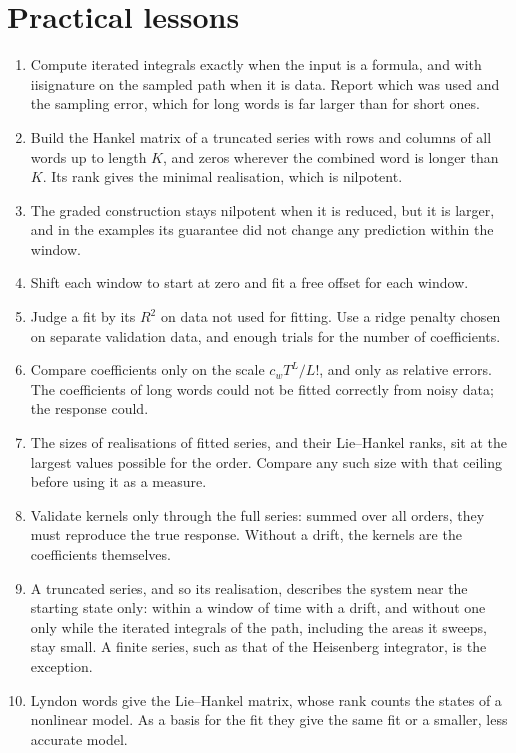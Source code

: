 \documentclass[11pt,a4paper]{article}
\theoremstyle{remark}
\begin{document}
\section{Practical lessons}\label{sec:lessons}
\begin{enumerate}
\item Compute iterated integrals exactly when the input is a formula, and with iisignature on the sampled path when it is data. Report which was used and the sampling error, which for long words is far larger than for short ones.
\item Build the Hankel matrix of a truncated series with rows and columns of all words up to length $K$, and zeros wherever the combined word is longer than $K$. Its rank gives the minimal realisation, which is nilpotent.
\item The graded construction stays nilpotent when it is reduced, but it is larger, and in the examples its guarantee did not change any prediction within the window.
\item Shift each window to start at zero and fit a free offset for each window.
\item Judge a fit by its $R^2$ on data not used for fitting. Use a ridge penalty chosen on separate validation data, and enough trials for the number of coefficients.
\item Compare coefficients only on the scale $c_wT^L/L!$, and only as relative errors. The coefficients of long words could not be fitted correctly from noisy data; the response could.
\item The sizes of realisations of fitted series, and their Lie--Hankel ranks, sit at the largest values possible for the order. Compare any such size with that ceiling before using it as a measure.
\item Validate kernels only through the full series: summed over all orders, they must reproduce the true response. Without a drift, the kernels are the coefficients themselves.
\item A truncated series, and so its realisation, describes the system near the starting state only: within a window of time with a drift, and without one only while the iterated integrals of the path, including the areas it sweeps, stay small. A finite series, such as that of the Heisenberg integrator, is the exception.
\item Lyndon words give the Lie--Hankel matrix, whose rank counts the states of a nonlinear model. As a basis for the fit they give the same fit or a smaller, less accurate model.
\end{enumerate}
\end{document}
